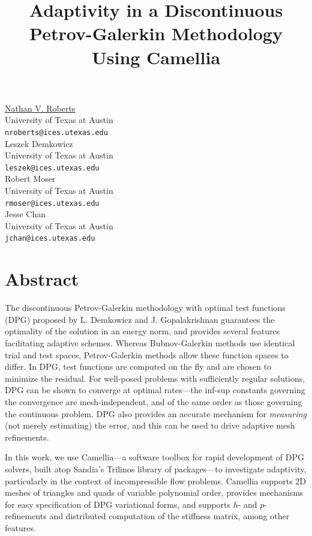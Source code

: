 \documentclass[article, A4, 11pt]{llncs}%
\begin{document}
\title{Adaptivity in a Discontinuous Petrov-Galerkin Methodology Using Camellia}
 \author{} \institute{}
\maketitle
\begin{center}
{\large \underline{Nathan V. Roberts}}\\
University of Texas at Austin\\
{\tt nroberts@ices.utexas.edu}
\\ \vspace{4mm}
{\large Leszek Demkowicz}\\
University of Texas at Austin\\
{\tt leszek@ices.utexas.edu}
\\ \vspace{4mm}
{\large Robert Moser}\\
University of Texas at Austin\\
{\tt rmoser@ices.utexas.edu}
\\ \vspace{4mm}
{\large Jesse Chan}\\
University of Texas at Austin\\
{\tt jchan@ices.utexas.edu}
\end{center}

\section*{Abstract}
The discontinuous Petrov-Galerkin methodology with optimal test functions (DPG) proposed by L. Demkowicz and J. Gopalakrishnan guarantees the optimality of the solution in an energy norm, and provides several features facilitating adaptive schemes.  Whereas Bubnov-Galerkin methods use identical trial and test spaces, Petrov-Galerkin methods allow these function spaces to differ. In DPG, test functions are computed on the fly and are chosen to minimize the residual. For well-posed problems with sufficiently regular solutions, DPG can be shown to converge at optimal rates---the inf-sup constants governing the convergence are mesh-independent, and of the same order as those governing the continuous problem. DPG also provides an accurate mechanism for \emph{measuring} (not merely estimating) the error, and this can be used to drive adaptive mesh refinements.

In this work, we use Camellia---a software toolbox for rapid development of DPG solvers, built atop Sandia's Trilinos library of packages---to investigate adaptivity, particularly in the context of incompressible flow problems.  Camellia supports 2D meshes of triangles and quads of variable polynomial order, provides mechanisms for easy specification of DPG variational forms, and supports $h$- and $p$- refinements and distributed computation of the stiffness matrix, among other features.
\end{document}
